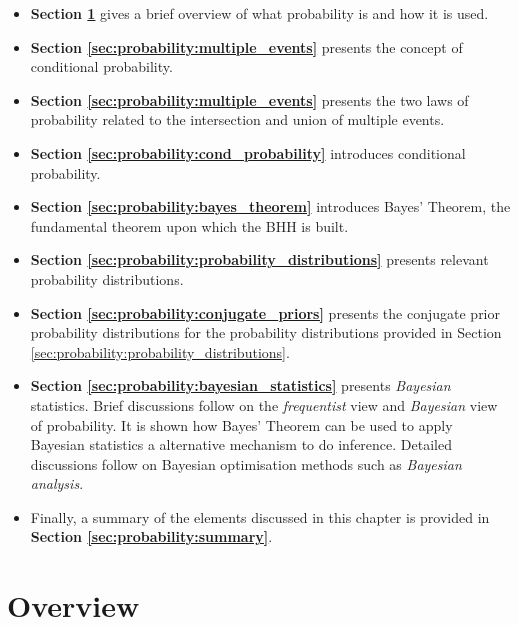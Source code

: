 \begin{itemize}
    \item \textbf{Section \ref{sec:probability:overview}} gives a brief overview of what probability is and how it is used.
    
    \item \textbf{Section \ref{sec:probability:multiple_events}} presents the concept of conditional probability.
    
    \item \textbf{Section \ref{sec:probability:multiple_events}} presents the two laws of probability related to the intersection and union of multiple events.
    
    \item \textbf{Section \ref{sec:probability:cond_probability}} introduces conditional probability. 
    
    \item \textbf{Section \ref{sec:probability:bayes_theorem}} introduces Bayes' Theorem, the fundamental theorem upon which the \ac{BHH} is built.

    \item \textbf{Section \ref{sec:probability:probability_distributions}} presents relevant probability distributions.

    \item \textbf{Section \ref{sec:probability:conjugate_priors}} presents the conjugate prior probability distributions for the probability distributions provided in Section \ref{sec:probability:probability_distributions}.

    \item \textbf{Section \ref{sec:probability:bayesian_statistics}} presents \textit{Bayesian} statistics. Brief discussions follow on the \textit{frequentist} view and \textit{Bayesian} view of probability. It is shown how Bayes' Theorem can be used to apply Bayesian statistics a alternative mechanism to do inference. Detailed discussions follow on Bayesian optimisation methods such as \textit{Bayesian analysis}.
    
    \item Finally, a summary of the elements discussed in this chapter is provided in \textbf{Section \ref{sec:probability:summary}}.
\end{itemize}




\section{Overview}
\label{sec:probability:overview}


